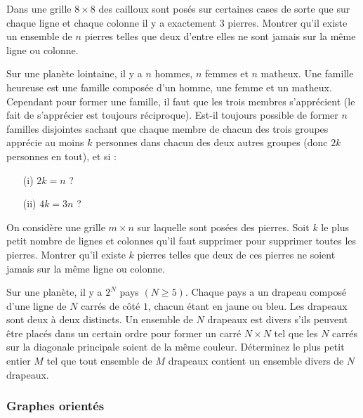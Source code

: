 \begin{exo}
Dans une grille $8\times 8$ des cailloux sont posés sur certaines cases de sorte que sur chaque ligne et chaque colonne il y a exactement $3$ pierres. Montrer qu'il existe un ensemble de $n$ pierres telles que deux d'entre elles ne sont jamais sur la même ligne ou colonne.
\end{exo}


\begin{exo}
Sur une planète lointaine, il y a $n$ hommes, $n$ femmes et $n$ matheux. Une famille heureuse est une famille composée d'un homme, une femme et un matheux. Cependant pour former une famille, il faut que les trois membres s'apprécient (le fait de s'apprécier est toujours réciproque). Est-il toujours possible de former $n$ familles disjointes sachant que chaque membre de chacun des trois groupes apprécie au moins $k$ personnes dans chacun des deux autres groupes (donc $2k$ personnes en tout), et si :

\begin{itemize}
\item[(i)] $2k = n$ ?
\item[(ii)] $4k = 3n$ ?
\end{itemize}
\end{exo}


\begin{exo}
On considère une grille $m \times n$ sur laquelle sont posées des pierres. Soit $k$ le plus petit nombre de lignes et colonnes qu'il faut supprimer pour supprimer toutes les pierres. Montrer qu'il existe $k$ pierres telles que deux de ces pierres ne soient jamais sur la même ligne ou colonne.
\end{exo}


\begin{exo}%
Sur une planète, il y a $2^N$ pays $(N \ge 5)$. Chaque pays a un drapeau composé d'une ligne de $N$ carrés de côté $1$, chacun étant en jaune ou bleu. Les drapeaux sont deux à deux distincts. Un ensemble de $N$ drapeaux est divers s'ils peuvent être placés dans un certain ordre pour former un carré $N \times N$ tel que les $N$ carrés sur la diagonale principale soient de la même couleur. Déterminez le plus petit entier $M$ tel que tout ensemble de $M$ drapeaux contient un ensemble divers de $N$ drapeaux.
\end{exo}


\subsubsection{Graphes orientés}


